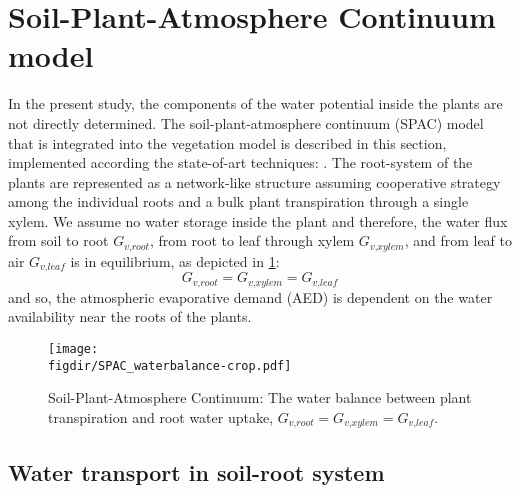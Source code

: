 \section{Soil-Plant-Atmosphere Continuum model}
\label{sec:spac}

In the present study, the components of the water potential inside the plants are not directly determined. The soil-plant-atmosphere continuum (SPAC) model that is integrated into the vegetation model is described in this section, implemented according the state-of-art techniques: \citep{Volpe2013,Manoli2014,Launiainen2015,Idso1977,Manzoni2011,Farquhar1980}. The root-system of the plants are represented as a network-like structure assuming cooperative strategy among the individual roots and a bulk plant transpiration through a single xylem. We assume no water storage inside the plant and therefore, the water flux from soil to root $G_{\textit{v,root}}$, from root to leaf through xylem $G_{\textit{v,xylem}}$, and from leaf to air $G_{\textit{v,leaf}}$ is in equilibrium, as depicted in \cref{fig:SPAC_waterbalance}:
\begin{equation}
G_{\textit{v,root}} = G_{\textit{v,xylem}} = G_{\textit{v,leaf}}
\label{eq:massfluxeq}
\end{equation}
and so, the atmospheric evaporative demand (AED) is dependent on the water availability near the roots of the plants.

\begin{figure}[t]
	\centering
	\texttt{[image: \\figdir/SPAC\_waterbalance-crop.pdf]}
	\caption{Soil-Plant-Atmosphere Continuum: The water balance between plant transpiration and root water uptake, $G_{\textit{v,root}} = G_{\textit{v,xylem}} = G_{\textit{v,leaf}}$.}
	\label{fig:SPAC_waterbalance}
\end{figure}

\subsection{Water transport in soil-root system}


